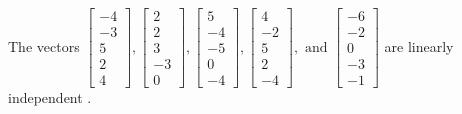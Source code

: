 \begin{exercise}
\begin{exerciseStatement}
  \end{exerciseStatement}
  \begin{exerciseAnswer}
   The vectors \(\left[\begin{array}{r}
-4 \\
-3 \\
5 \\
2 \\
4
\end{array}\right] , \left[\begin{array}{r}
2 \\
2 \\
3 \\
-3 \\
0
\end{array}\right] , \left[\begin{array}{r}
5 \\
-4 \\
-5 \\
0 \\
-4
\end{array}\right] , \left[\begin{array}{r}
4 \\
-2 \\
5 \\
2 \\
-4
\end{array}\right] , \text{ and } \left[\begin{array}{r}
-6 \\
-2 \\
0 \\
-3 \\
-1
\end{array}\right]\) are 
  	 linearly independent  .
  


  \end{exerciseAnswer}
\end{exercise}